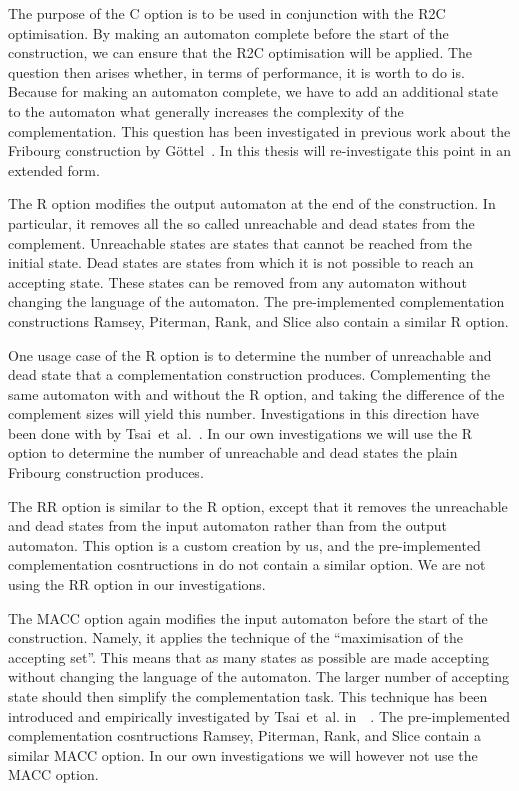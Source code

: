 The purpose of the C option is to be used in conjunction with the R2C optimisation. By making an automaton complete before the start of the construction, we can ensure that the R2C optimisation will be applied. The question then arises whether, in terms of performance, it is worth to do is. Because for making an automaton complete, we have to add an additional state to the automaton what generally increases the complexity of the complementation. This question has been investigated in previous work about the Fribourg construction by Göttel~\cite{2013_bsc_goettel}. In this thesis will re-investigate this point in an extended form.

The R option modifies the output automaton at the end of the construction. In particular, it removes all the so called unreachable and dead states from the complement. Unreachable states are states that cannot be reached from the initial state. Dead states are states from which it is not possible to reach an accepting state. These states can be removed from any automaton without changing the language of the automaton. The pre-implemented complementation constructions Ramsey, Piterman, Rank, and Slice also contain a similar R option.

One usage case of the R option is to determine the number of unreachable and dead state that a complementation construction produces. Complementing the same automaton with and without the R option, and taking the difference of the complement sizes will yield this number. Investigations in this direction have been done with \goal{} by Tsai~et~al.~\cite{2011_tsai}. In our own investigations we will use the R option to determine the number of unreachable and dead states the plain Fribourg construction produces.

The RR option is similar to the R option, except that it removes the unreachable and dead states from the input automaton rather than from the output automaton. This option is a custom creation by us, and the pre-implemented complementation cosntructions in \goal{} do not contain a similar option. We are not using the RR option in our investigations.

The MACC option again modifies the input automaton before the start of the construction. Namely, it applies the technique of the ``maximisation of the accepting set''. This means that as many states as possible are made accepting without changing the language of the automaton. The larger number of accepting state should then simplify the complementation task. This technique has been introduced and empirically investigated by Tsai~et~al. in~~\cite{2011_tsai}. The pre-implemented complementation cosntructions Ramsey, Piterman, Rank, and Slice contain a similar MACC option. In our own investigations we will however not use the MACC option.

